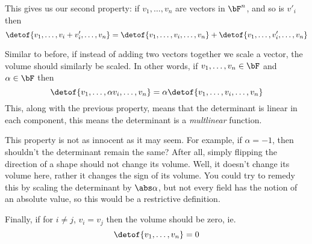     This gives us our second property: if $v_1,\dots,v_n$ are vectors in $\bF^n$, and so is $v'_i$ then
    \[ \detof{v_1,\dots,v_i+v_i',\dots,v_n} = \detof{v_1,\dots,v_i,\dots,v_n} + \detof{v_1,\dots,v'_i,\dots,v_n} \]

    \item Similar to before, if instead of adding two vectors together we scale a vector, the volume should similarly be scaled.
    In other words, if $v_1,\dots,v_n\in\bF$ and $\alpha\in\bF$ then
    \[ \detof{v_1,\dots,\alpha v_i,\dots,v_n} = \alpha\detof{v_1,\dots,v_i,\dots,v_n} \]
    This, along with the previous property, means that the determinant is linear in each component, this means the determinant is a \emph{multlinear} function.

    This property is not as innocent as it may seem.
    For example, if $\alpha=-1$, then shouldn't the determinant remain the same?
    After all, simply flipping the direction of a shape should not change its volume.
    Well, it doesn't change its volume here, rather it changes the sign of its volume.
    You could try to remedy this by scaling the determinant by $\abs\alpha$, but not every field has the notion of an absolute value, so this would be a restrictive definition.

    \item Finally, if for $i\neq j$, $v_i=v_j$ then the volume should be zero, ie.
    \[ \detof{v_1,\dots,v_n} = 0 \]
\eenum

